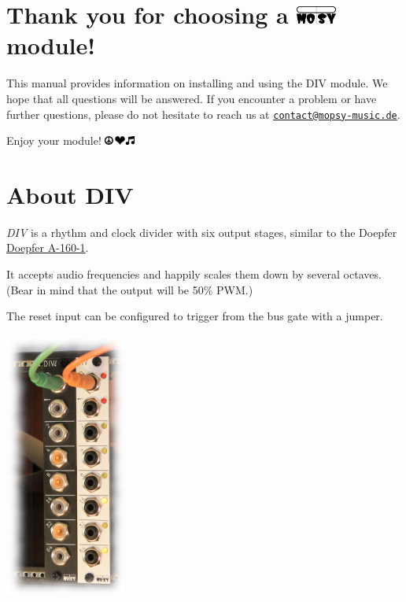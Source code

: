 \documentclass[a4paper,
               11pt,
               parskip=half,
               headinclude,
               titlepage=false]{scrartcl}
\begin{document}
\begin{minipage}[]{10.5cm}
\setlength{\parskip}{\medskipamount}
\section*{Thank you for choosing a \includegraphics[height=0.8em]{moPsy_logo} module!}

This manual provides information on installing and using the DIV module.
We hope that all questions will be answered.
If you encounter a problem or have further questions,
please do not hesitate to reach us at \href{mailto:contact@mopsy-music.de}{\texttt{contact@mopsy-music.de}}.


\vspace{1em}
\begin{center}
Enjoy your module! \quad \includegraphics[height=0.8em]{peace_love_music}
\end{center}

\section*{About DIV}

\emph{DIV} is a rhythm and clock divider with six output stages, similar to the Doepfer \href{https://doepfer.de/a160.htm}{Doepfer A-160-1}.

It accepts audio frequencies and happily scales them down by several octaves. (Bear in mind that the output will be 50\% PWM.)

The reset input can be configured to trigger from the bus gate with a jumper.

\end{minipage}%
\hspace{0.5cm}
\begin{minipage}[]{4cm}
\includegraphics[width=4cm]{div-case-shot-frame}
\end{minipage}
\end{document}
